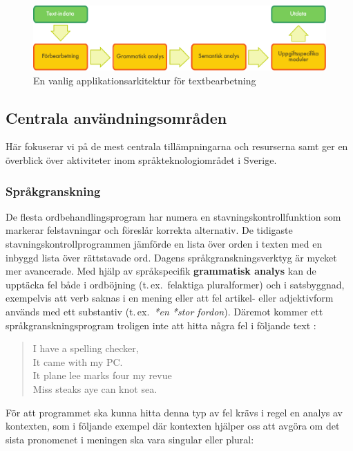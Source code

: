 \begin{multicols}{2}
\begin{figure}[htb]
  \center
  \includegraphics[width=\textwidth]{../_media/swedish/text_processing_app_architecture}
  \caption{En vanlig applikationsarkitektur för textbearbetning}
  \label{fig:textprocessingarch_sv}
\end{figure}

\subsection{Centrala användningsområden} 

Här fokuserar vi på de mest centrala tillämpningarna och resurserna
samt ger en överblick över aktiviteter inom språkteknologiområdet i
Sverige.

\subsubsection{Språkgranskning}

De flesta ordbehandlingsprogram har numera en
stavningskontrollfunktion som markerar felstavningar och föreslår
korrekta alternativ. De tidigaste stavningskontrollprogrammen jämförde
en lista över orden i texten med en inbyggd lista över rättstavade
ord. Dagens språkgranskningsverktyg är mycket mer avancerade. Med
hjälp av språkspecifik \textbf{grammatisk analys} kan de upptäcka fel
både i ordböjning (t.\,ex.~felaktiga pluralformer) och i satsbyggnad,
exempelvis att verb saknas i en mening eller att fel artikel- eller
adjektivform används med ett substantiv (t.\,ex.~\textit{*en *stor
  fordon}). Däremot kommer ett språkgranskningsprogram troligen inte
att hitta några fel i följande text \cite{zar1}:

\begin{quote}
  I have a spelling checker,\\
  It came with my PC.\\
  It plane lee marks four my revue\\
  Miss steaks aye can knot sea.
\end{quote}

För att programmet ska kunna hitta denna typ av fel krävs i regel en
analys av kontexten, som i följande exempel där kontexten hjälper oss
att avgöra om det sista pronomenet i meningen ska vara singular eller
plural:


\end{multicols}
